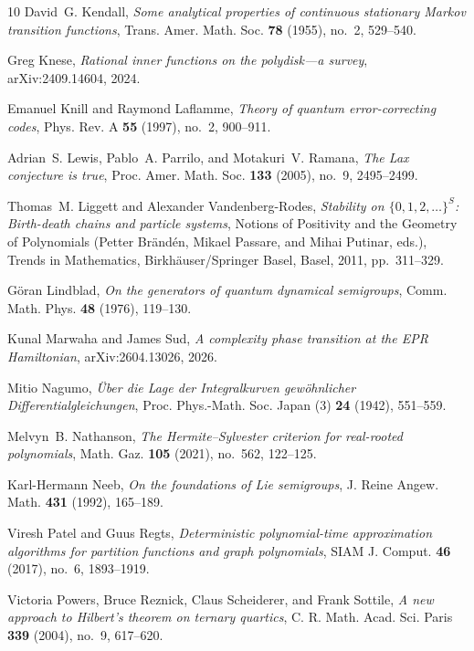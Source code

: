 \documentclass[reqno]{amsart}
\theoremstyle{definition}
\theoremstyle{remark}
\begin{document}
\begin{thebibliography}{10}
David~G. Kendall, \emph{Some analytical properties of continuous stationary
  {Markov} transition functions}, Trans. Amer. Math. Soc. \textbf{78} (1955),
  no.~2, 529--540.

Greg Knese, \emph{Rational inner functions on the polydisk---a survey},
  arXiv:2409.14604, 2024.

Emanuel Knill and Raymond Laflamme, \emph{Theory of quantum error-correcting
  codes}, Phys. Rev. A \textbf{55} (1997), no.~2, 900--911.

Adrian~S. Lewis, Pablo~A. Parrilo, and Motakuri~V. Ramana, \emph{The {Lax}
  conjecture is true}, Proc. Amer. Math. Soc. \textbf{133} (2005), no.~9,
  2495--2499.

Thomas~M. Liggett and Alexander Vandenberg-Rodes, \emph{Stability on
  {$\{0,1,2,\ldots\}^{S}$}: Birth-death chains and particle systems}, Notions
  of Positivity and the Geometry of Polynomials (Petter Br{\"a}nd{\'e}n, Mikael
  Passare, and Mihai Putinar, eds.), Trends in Mathematics,
  Birkh{\"a}user/Springer Basel, Basel, 2011, pp.~311--329.

G{\"o}ran Lindblad, \emph{On the generators of quantum dynamical semigroups},
  Comm. Math. Phys. \textbf{48} (1976), 119--130.

Kunal Marwaha and James Sud, \emph{A complexity phase transition at the {EPR
  Hamiltonian}}, arXiv:2604.13026, 2026.

Mitio Nagumo, \emph{{\"U}ber die {Lage} der {Integralkurven} gew{\"o}hnlicher
  {Differentialgleichungen}}, Proc. Phys.-Math. Soc. Japan (3) \textbf{24}
  (1942), 551--559.

Melvyn~B. Nathanson, \emph{The {Hermite--Sylvester} criterion for real-rooted
  polynomials}, Math. Gaz. \textbf{105} (2021), no.~562, 122--125.

Karl-Hermann Neeb, \emph{On the foundations of {Lie} semigroups}, J. Reine
  Angew. Math. \textbf{431} (1992), 165--189.

Viresh Patel and Guus Regts, \emph{Deterministic polynomial-time approximation
  algorithms for partition functions and graph polynomials}, SIAM J. Comput.
  \textbf{46} (2017), no.~6, 1893--1919.

Victoria Powers, Bruce Reznick, Claus Scheiderer, and Frank Sottile, \emph{A
  new approach to {Hilbert}'s theorem on ternary quartics}, C. R. Math. Acad.
  Sci. Paris \textbf{339} (2004), no.~9, 617--620.


\end{thebibliography}
\end{document}
